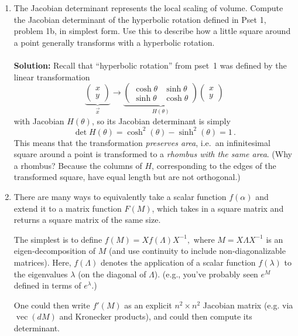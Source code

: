 \documentclass{article}
\newcommand{\vecm}{\operatorname{vec}}
\begin{document}
\begin{enumerate}
\item The Jacobian determinant represents the  local scaling of volume.  Compute the Jacobian determinant of the
hyperbolic rotation defined in Pset 1, problem 1b, in simplest form.  Use this to describe how a little square
around a point generally transforms with a hyperbolic rotation.
\\
\\
\textbf{Solution:} Recall that ``hyperbolic rotation'' from pset~1 was defined by the linear transformation
$$
\underbrace{\begin{pmatrix} x \\ y \end{pmatrix}}_{\vec{x}} \to \underbrace{\begin{pmatrix} \cosh \theta & \sinh \theta \\ \sinh \theta & \cosh\theta \end{pmatrix}}_{H(\theta)} \begin{pmatrix} x \\ y \end{pmatrix}
$$
with Jacobian $H(\theta)$, so its Jacobian determinant is simply
$$
\det H(\theta) = \cosh^2(\theta) - \sinh^2(\theta) = \boxed{1} \, .
$$
This means that the transformation \emph{preserves area}, i.e.~an infinitesimal square around a point is transformed to a \emph{rhombus with the same area}.  (Why a rhombus?  Because the columns of $H$, corresponding to the edges of the transformed square, have equal length but are not orthogonal.)


\item   There are many ways to equivalently take a scalar function $f(\alpha)$ and extend it to a matrix function $F(M)$, which takes in a square matrix and returns a square matrix of the same size.

The simplest is to define
$f(M)=X f(\Lambda) X^{-1},$ where $M=X\Lambda X^{-1}$ is an eigen-decomposition of $M$ (and use continuity to include
non-diagonalizable matrices).  Here, $f(\Lambda)$ denotes the application of a scalar function $f(\lambda)$ to the eigenvalues $\lambda$ (on the diagonal of $\Lambda$).  (e.g., you've probably seen $e^M$ defined in terms of $e^\lambda$.)

One could then write $f'(M)$ as an explicit $n^2\times n^2$ Jacobian matrix (e.g. via $\vecm(dM)$ and Kronecker products), and could then  compute its determinant.

\begin{enumerate}


\end{enumerate}
\end{enumerate}
\end{document}
